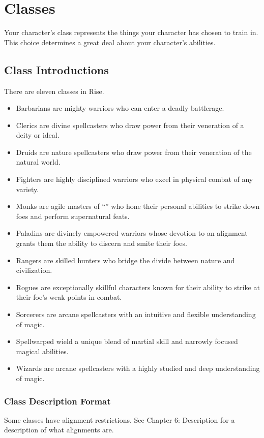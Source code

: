 \chapter{Classes}
Your character's class represents the things your character has chosen to train in.
This choice determines a great deal about your character's abilities.

\section{Class Introductions}
There are eleven classes in Rise.
\begin{itemize}
    \item Barbarians are mighty warriors who can enter a deadly battlerage.
    \item Clerics are divine spellcasters who draw power from their veneration of a deity or ideal.
    \item Druids are nature spellcasters who draw power from their veneration of the natural world.
    \item Fighters are highly disciplined warriors who excel in physical combat of any variety.
    \item Monks are agile masters of ``\ki'' who hone their personal abilities to strike down foes and perform supernatural feats.
    \item Paladins are divinely empowered warriors whose devotion to an alignment grants them the ability to discern and smite their foes.
    \item Rangers are skilled hunters who bridge the divide between nature and civilization.
    \item Rogues are exceptionally skillful characters known for their ability to strike at their foe's weak points in combat.
    \item Sorcerers are arcane spellcasters with an intuitive and flexible understanding of magic.
    \item Spellwarped wield a unique blend of martial skill and narrowly focused magical abilities.
    \item Wizards are arcane spellcasters with a highly studied and deep understanding of magic.
\end{itemize}

\subsection{Class Description Format}

Some classes have alignment restrictions.
See Chapter 6: Description for a description of what alignments are.

